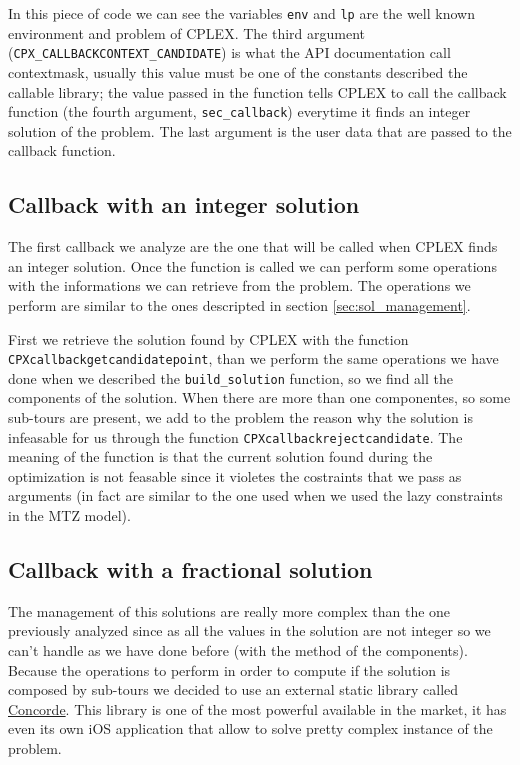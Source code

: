In this piece of code we can see the variables \verb|env| and \verb|lp| are the well known environment and problem of CPLEX. The third argument (\verb|CPX_CALLBACKCONTEXT_CANDIDATE|) is what the API documentation call contextmask, usually this value must be one of the constants described the callable library; the value passed in the function tells CPLEX to call the callback function (the fourth argument, \verb|sec_callback|) everytime it finds an integer solution of the problem. The last argument is the user data that are passed to the callback function.


\subsection{Callback with an integer solution}
The first callback we analyze are the one that will be called when CPLEX finds an integer solution. Once the function is called we can perform some operations with the informations we can retrieve from the problem. The operations we perform are similar to the ones descripted in section \ref{sec:sol_management}.

First we retrieve the solution found by CPLEX with the function \verb|CPXcallbackgetcandidatepoint|, than we perform the same operations we have done when we described the \verb|build_solution| function, so we find all the components of the solution. When there are more than one componentes, so some sub-tours are present, we add to the problem the reason why the solution is infeasable for us through the function \verb|CPXcallbackrejectcandidate|. The meaning of the function is that the current solution found during the optimization is not feasable since it violetes the costraints that we pass as arguments (in fact are similar to the one used when we used the lazy constraints in the MTZ model).

\subsection{Callback with a fractional solution}
The management of this solutions are really more complex than the one previously analyzed since as all the values in the solution are not integer so we can't handle as we have done before (with the method of the components). Because the operations to perform in order to compute if the solution is composed by sub-tours we decided to use an external static library called \href{https://www.math.uwaterloo.ca/tsp/concorde.html}{Concorde}.
This library is one of the most powerful available in the market, it has even its own iOS application that allow to solve pretty complex instance of the problem.

